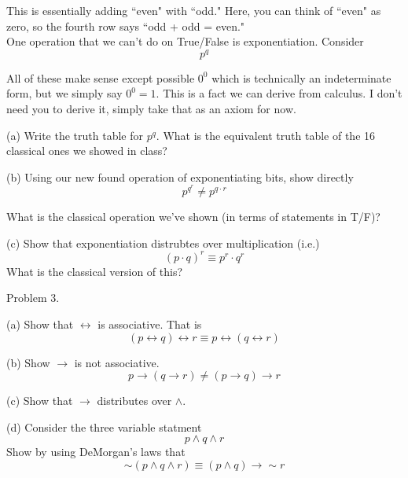 \documentclass[16 pt]{amsart}
\theoremstyle{definition}
\theoremstyle{remark}
\numberwithin{equation}{subsection}
\begin{document}
This is essentially adding ``even" with ``odd." Here, you can think of ``even" as zero, so the fourth row says ``odd + odd = even."\\

One operation that we can't do on True/False is exponentiation.  Consider
\[
p^q
\]

All of these make sense except possible $0^0$ which is technically an indeterminate form, but we simply say $0^0 = 1$.  This is a fact we can derive from calculus.  I don't need you to derive it, simply take that as an axiom for now.\\

\vspace{.25in}

(a) Write the truth table for $p^q$.  What is the equivalent truth table of the 16 classical ones we showed in class?

\vspace{.25in}

(b) Using our new found operation of exponentiating bits, show directly
\[
p^{q^r} \neq p^{q\cdot r}
\]

What is the classical operation we've shown (in terms of statements in T/F)?

\vspace{.25in}

(c) Show that exponentiation distrubtes over multiplication (i.e.)
\[
(p\cdot q)^r \equiv p^r \cdot q^r
\]
What is the classical version of this?

\newpage

Problem 3. 

(a) Show that $\leftrightarrow$ is associative. That is
\[
(p \leftrightarrow q) \leftrightarrow r \equiv p \leftrightarrow ( q \leftrightarrow r)
\]


\vspace{.5in}

(b) Show $\rightarrow$ is not associative.  
\[
p \rightarrow (q \rightarrow r) \neq (p \rightarrow q) \rightarrow r
\]

\vspace{.5in}

(c) Show that $\rightarrow$ distributes over $\wedge$.

\vspace{.5in}

(d) Consider the three variable statment
\[
p\wedge q \wedge r
\]
Show by using DeMorgan's laws that
\[
\sim(p\wedge q\wedge r) \equiv (p\wedge q) \rightarrow \sim r
\]
\end{document}

